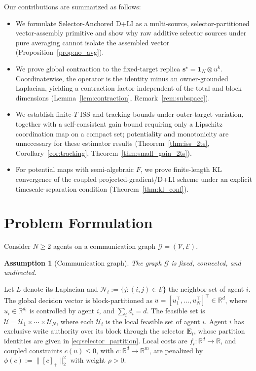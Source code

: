 \documentclass[letterpaper, 10 pt, conference]{ieeeconf} %
\newtheorem{assumption}{Assumption}
\begin{document}
Our contributions are summarized as follows:
\begin{itemize}
    \setlength{\topsep}{1pt}
    \setlength{\itemsep}{0pt}
    \setlength{\parsep}{0pt}
    \setlength{\partopsep}{0pt}
    \item We formulate Selector-Anchored D+LI as a multi-source, selector-partitioned vector-assembly primitive and show why raw additive selector sources under pure averaging cannot isolate the assembled vector (Proposition~\ref{prop:no_avg}).
    \item We prove global contraction to the fixed-target replica \(\mathbf s^\star=\mathbf1_N\otimes u^k\). Coordinatewise, the operator is the identity minus an owner-grounded Laplacian, yielding a contraction factor independent of the total and block dimensions (Lemma~\ref{lem:contraction}, Remark~\ref{rem:subspace}).
    \item We establish finite-\(T\) ISS and tracking bounds under outer-target variation, together with a self-consistent gain bound requiring only a Lipschitz coordination map on a compact set; potentiality and monotonicity are unnecessary for these estimator results (Theorem~\ref{thm:iss_2ts}, Corollary~\ref{cor:tracking}, Theorem~\ref{thm:small_gain_2ts}).
    \item For potential maps with semi-algebraic \(F\), we prove finite-length KL convergence of the coupled projected-gradient/D+LI scheme under an explicit timescale-separation condition (Theorem~\ref{thm:kl_conf}).
\end{itemize}

\section{Problem Formulation}
Consider \(N\ge2\) agents on a communication graph \(\mathcal G=(\mathcal V,\mathcal E)\). 
\begin{assumption}[Communication graph]
\label{ass:graph}
The graph \(\mathcal G\) is fixed, connected, and undirected.
\end{assumption}
Let \(L\) denote its Laplacian and \(\mathcal N_i:=\{j:(i,j)\in\mathcal E\}\) the neighbor set of agent \(i\). The global decision vector is block-partitioned as \(u=[u_1^\top,\dots,u_N^\top]^\top\in\mathbb{R}^d\), where \(u_i\in\mathbb{R}^{d_i}\) is controlled by agent \(i\), and \(\sum_i d_i=d\). The feasible set is \(\mathcal U=\mathcal U_1\times\cdots\times\mathcal U_N\), where each \(\mathcal U_i\) is the local feasible set of agent \(i\). Agent \(i\) has exclusive write authority over its block through the selector \(\mathbf E_i\), whose partition identities are given in \eqref{eq:selector_partition}. Local costs are $f_i:\mathbb{R}^d\to\mathbb{R}$, and coupled constraints $c(u)\le0$, with $c:\mathbb{R}^d\to\mathbb{R}^m$, are penalized by $\phi(c):=\|[c]_+\|_2^2$ with weight $\rho>0$.
\end{document}
